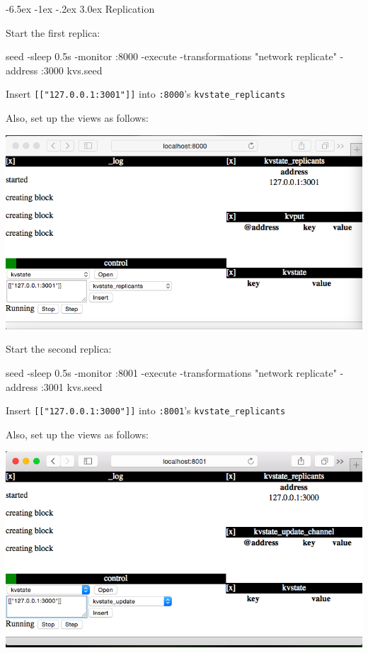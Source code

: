 \documentclass[a5paper,12pt,onecolumn]{article}
\makeatletter
\def\code#1{\mbox{\lstinline{#1}}}
\renewcommand\section{\@startsection {section}{1}{\z@}%
	{-6.5ex \@plus -1ex \@minus -.2ex}%
	{3.0ex}%
	{\sf\Large}}
\makeatother
\begin{document}
\section{Replication}

Start the first replica:

\begin{cli}
seed -sleep 0.5s -monitor :8000 -execute -transformations "network  replicate" -address :3000 kvs.seed
\end{cli}

Insert \code{[["127.0.0.1:3001"]]} into \code{:8000}'s \code{kvstate_replicants}

Also, set up the views as follows:

\includegraphics{replicate/first.png}

Start the second replica:

\begin{cli}
seed -sleep 0.5s -monitor :8001 -execute -transformations "network  replicate" -address :3001 kvs.seed
\end{cli}

Insert \code{[["127.0.0.1:3000"]]} into \code{:8001}'s \code{kvstate_replicants}

Also, set up the views as follows:

\includegraphics{replicate/second.png}
\end{document}
